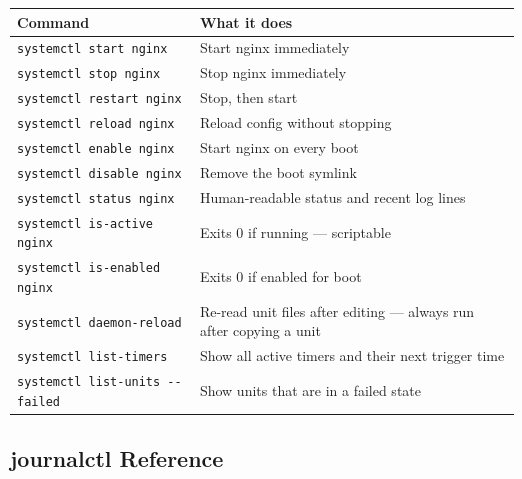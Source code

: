 \documentclass[11pt,a4paper]{article}
\begin{document}
\begin{center}
\begin{tabular}{L{6.5cm}L{7cm}}
\toprule
\textbf{Command} & \textbf{What it does} \\
\midrule
\texttt{systemctl start nginx}          & Start nginx immediately \\
\texttt{systemctl stop nginx}           & Stop nginx immediately \\
\texttt{systemctl restart nginx}        & Stop, then start \\
\texttt{systemctl reload nginx}         & Reload config without stopping \\
\texttt{systemctl enable nginx}         & Start nginx on every boot \\
\texttt{systemctl disable nginx}        & Remove the boot symlink \\
\texttt{systemctl status nginx}         & Human-readable status and recent log lines \\
\texttt{systemctl is-active nginx}      & Exits 0 if running — scriptable \\
\texttt{systemctl is-enabled nginx}     & Exits 0 if enabled for boot \\
\texttt{systemctl daemon-reload}        & Re-read unit files after editing — always run after copying a unit \\
\texttt{systemctl list-timers}          & Show all active timers and their next trigger time \\
\texttt{systemctl list-units -{}-failed} & Show units that are in a failed state \\
\bottomrule
\end{tabular}
\end{center}

\subsection{journalctl Reference}
\end{document}
